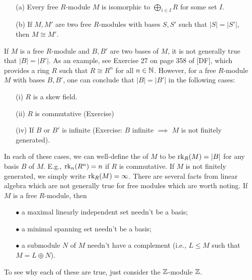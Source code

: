\documentclass[11pt]{book}
\theoremstyle{definition}   \newtheorem{defn}[counter]{Definition} %
\newcommand{\vs}{\vspace{8pt}}
\numberwithin{counter}{chapter}
\begin{document}
\vs

\begin{corollary}\
\begin{enumerate}
\item[(a)] Every free $R$-module $M$ is isomorphic to $\bigoplus_{i \in I} R$ for some set $I$.
\item[(b)] If $M,M'$ are two free $R$-modules with bases $S,S'$ such that $|S| = |S'|$, then $M \cong M'$.
\end{enumerate}
\end{corollary}

\vs

\begin{remark}
If $M$ is a free $R$-module and $B,B'$ are two bases of $M$, it is not generally true that $|B| = |B'|$. As an example, see Exercise 27 on page 358 of [DF], which provides a ring $R$ such that $R \cong R^n$ for all $n \in \operatorname{\mathbb{N}}$. However, for a free $R$-module $M$ with bases $B,B'$, one can conclude that $|B| = |B'|$ in the following cases:
\begin{enumerate}
\item[(i)] $R$ is a skew field.
\item[(ii)] $R$ is commutative (Exercise)
\item[(iv)] If $B$ or $B'$ is infinite (Exercise: $B$ infinite $\implies$ $M$ is not finitely generated).
\end{enumerate}

In each of these cases, we can well-define the  of $M$ to be $\textnormal{rk}_R(M) = |B|$ for any basis $B$ of $M$. E.g., $\textnormal{rk}_n(R^n) = n$ if $R$ is commutative. If $M$ is not finitely generated, we simply write $\textnormal{rk}_R(M) = \infty$. There are several facts from linear algebra which are not generally true for free modules which are worth noting. If $M$ is a free $R$-module, then
\begin{enumerate}
\item[$\bullet$] a maximal linearly independent set needn't be a basis;
\item[$\bullet$] a minimal spanning set needn't be a basis;
\item[$\bullet$] a submodule $N$ of $M$ needn't have a complement (i.e., $L \leq M$ such that $M = L \oplus N$).
\end{enumerate}

To see why each of these are true, just consider the $\operatorname{\mathbb{Z}}$-module $\operatorname{\mathbb{Z}}$.
\end{remark}

\vs
\end{document}
